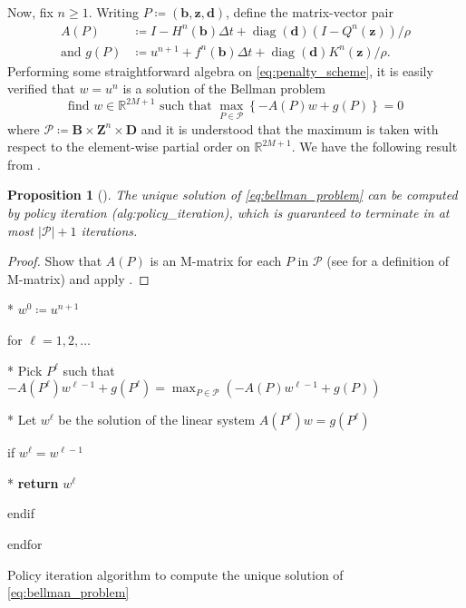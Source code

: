 \documentclass[12pt]{article}
\newcounter{dummy}
\newtheorem{proposition}[dummy]{Proposition}
\begin{document}
Now, fix $n{\geqslant}1$. Writing $P\coloneqq(\boldsymbol{b},\boldsymbol{z},\boldsymbol{d})$,
define the matrix-vector pair
\begin{align*}
A(P) & \coloneqq I-H^{n}(\boldsymbol{b})\Delta t+{\operatorname{diag}}(\boldsymbol{d})(I-Q^{n}(\boldsymbol{z}))/\rho\\
\text{and }g(P) & \coloneqq u^{n+1}+f^{n}(\boldsymbol{b})\Delta t+{\operatorname{diag}}(\boldsymbol{d})K^{n}(\boldsymbol{z})/\rho.
\end{align*}
Performing some straightforward algebra on \eqref{eq:penalty_scheme},
it is easily verified that $w=u^{n}$ is a solution of the Bellman
problem
\begin{equation}
\text{find }w\in\mathbb{R}^{2M+1}\text{ such that }\max_{P\in\mathcal{P}}\left\{ -A(P)w+g(P)\right\} =0\label{eq:bellman_problem}
\end{equation}
where $\mathcal{P}\coloneqq\boldsymbol{B}\times\boldsymbol{Z}^{n}\times\boldsymbol{D}$
and it is understood that the maximum is taken with respect to the
element-wise partial order on $\mathbb{R}^{2M+1}$. We have the following
result from \cite{MR3493959}.
\begin{proposition}[\cite{MR3493959}]
\label{prop:bellman}The unique solution of \eqref{eq:bellman_problem}
can be computed by policy iteration ({\prettyref}{alg:policy_iteration}),
which is guaranteed to terminate in at most $|\mathcal{P}|+1$
iterations.
\end{proposition}
\begin{proof}
Show that $A(P)$ is an M-matrix for each $P$ in $\mathcal{P}$ (see
\cite{MR0444681} for a definition of M-matrix) and apply \cite[Theorem 2.1]{MR2551155}.
\end{proof}
\begin{algorithm}[H]
\begin{algor}[1]
\item [{{*}}] $w^{0}\coloneqq u^{n+1}$
\item [{for}] $\ell=1,2,\ldots$
\begin{algor}[1]
\item [{{*}}] Pick $P^{\ell}$ such that $-A(P^{\ell})w^{\ell-1}+g(P^{\ell})=\max_{P\in\mathcal{P}}(-A(P)w^{\ell-1}+g(P))$
\item [{{*}}] Let $w^{\ell}$ be the solution of the linear system $A(P^{\ell})w=g(P^{\ell})$
\item [{if}] $w^{\ell}=w^{\ell-1}$
\begin{algor}[1]
\item [{{*}}] \textbf{return} $w^{\ell}$
\end{algor}
\item [{endif}]~
\end{algor}
\item [{endfor}]~
\end{algor}
\caption{Policy iteration algorithm to compute the unique solution of \eqref{eq:bellman_problem}\label{alg:policy_iteration}}
\end{algorithm}
\end{document}
